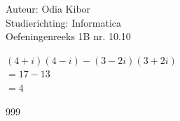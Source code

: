 \documentclass[a4paper]{article}
\begin{document}
  
\noindent \large Auteur: Odia Kibor \\
\noindent \large Studierichting: Informatica\\
\noindent \large Oefeningenreeks 1B nr. 10.10\\

\medskip

\normalsize

$(4+i)(4-i)-(3-2i)(3+2i)$\\

$=17-13$\\

$=4$\\


\begin{thebibliography}{999}
\end{thebibliography}
\end{document}
